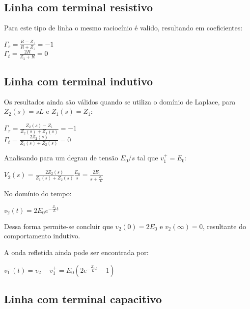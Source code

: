 \subsection{Linha com terminal resistivo}

Para este tipo de linha o mesmo raciocínio é valido, resultando em coeficientes:

\begin{center}
    $\Gamma_r = \frac{R-Z_1}{R+Z_1} = -1$ \\ \vspace{1pt}
    $\Gamma_t = \frac{2R}{Z_1+R} = 0$
\end{center}

\subsection{Linha com terminal indutivo}

Os resultados ainda são válidos quando se utiliza o domínio de Laplace, para $Z_2(s) = sL$ e $Z_1(s)=Z_1$:

\begin{center}
    $\Gamma_r = \frac{Z_2(s)-Z_1}{Z_2(s)+Z_1(s)} = -1$ \\ \vspace{1pt}
    $\Gamma_t = \frac{2Z_2(s)}{Z_1(s)+Z_2(s)} = 0$
\end{center}

Analisando para um degrau de tensão $E_0/s$ tal que $v_1^{+}=E_0$:

\begin{center}
    $V_2(s) = \frac{2Z_2(s)}{Z_1(s)+Z_2(s)}\frac{E_0}{s} = \frac{2E_0}{s+\frac{Z_1}{L}}$
\end{center}

No domínio do tempo:

\begin{center}
    $v_2(t) = 2E_0e^{-\frac{Z_1}{L}t}$
\end{center}

Dessa forma permite-se concluir que $v_2(0)=2E_0$ e $v_2(\infty)=0$, resultante do comportamento indutivo.

A onda refletida ainda pode ser encontrada por:

\begin{center}
    $v_1^{-}(t) = v_2-v_1^{+} = E_0(2e^{-\frac{Z_1}{L}t}-1)$
\end{center}


\subsection{Linha com terminal capacitivo}

